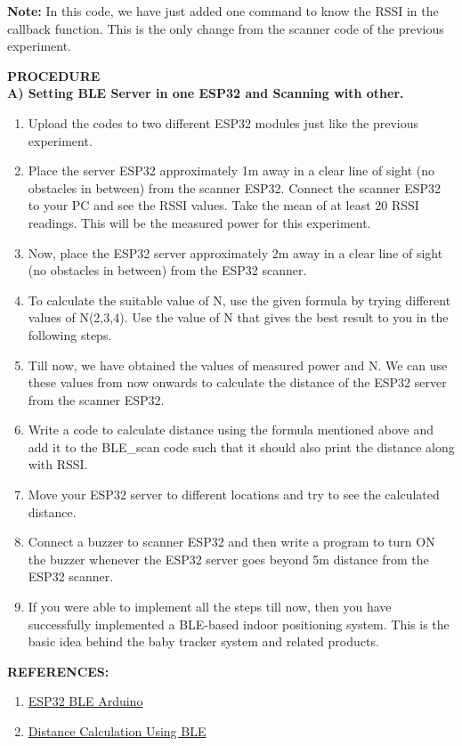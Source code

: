 \documentclass[12pt,a4paper]{article}
\begin{document}
\noindent \textbf{Note:} In this code, we have just added one command to know the RSSI in the callback function. This is the only change from the scanner code of the previous experiment.

\vspace{4cm}
\begin{justify}
\noindent \textbf{\large PROCEDURE}\\[6pt]
\textbf{A) Setting BLE Server in one ESP32 and Scanning with other.}
\vspace{-3mm}
\begin{enumerate}
\setlength\itemsep{-0.3em}
\item Upload the codes to two different ESP32 modules just like the previous experiment.
\item Place the server ESP32 approximately 1m away in a clear line of sight (no obstacles in between) from the scanner ESP32. Connect the scanner ESP32 to your PC and see the RSSI values. Take the mean of at least 20 RSSI readings. This will be the measured power for this experiment.
\item Now, place the ESP32 server approximately 2m away in a clear line of sight (no obstacles in between) from the ESP32 scanner. 
\item To calculate the suitable value of N, use the given formula by trying different values of N(2,3,4). Use the value of N that gives the best result to you in the following steps.
\item Till now, we have obtained the values of measured power and N. We can use these values from now onwards to calculate the distance of the ESP32 server from the scanner ESP32.
\item Write a code to calculate distance using the formula mentioned above and add it to the BLE\_scan code such that it should also print the distance along with RSSI.  
\item Move your ESP32 server to different locations and try to see the calculated distance. 
\item Connect a buzzer to scanner ESP32 and then write a program to turn ON the buzzer whenever the ESP32 server goes beyond 5m distance from the ESP32 scanner.
\item If you were able to implement all the steps till now, then you have successfully implemented a BLE-based indoor positioning system. This is the basic idea behind the baby tracker system and related products.
\end{enumerate}


\textbf{\large REFERENCES:}
\vspace{-6mm}
\begin{enumerate}
\setlength\itemsep{-0.3em}
\item \href{https://www.arduino.cc/reference/en/libraries/esp32-ble-arduino/}{ESP32 BLE Arduino}
\item \href{https://iotandelectronics.wordpress.com/2016/10/07/how-to-calculate-distance-from-the-rssi-value-of-the-ble-beacon/}{Distance Calculation Using BLE}
\end{enumerate}
\end{justify}
\end{document}
